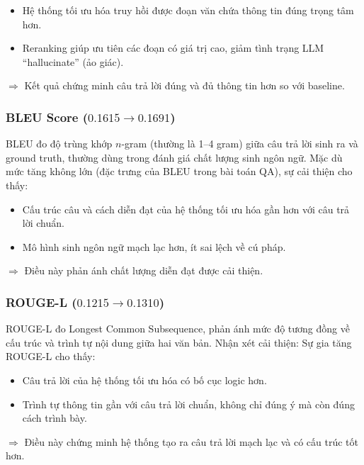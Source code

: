 \begin{itemize}
    \item Hệ thống tối ưu hóa truy hồi được đoạn văn chứa thông tin đúng trọng tâm hơn.
    \item Reranking giúp ưu tiên các đoạn có giá trị cao, giảm tình trạng LLM ``hallucinate'' (ảo
    giác).
\end{itemize}

$\Rightarrow$ Kết quả chứng minh câu trả lời đúng và đủ thông tin hơn so với baseline.

\subsubsection*{BLEU Score ($0.1615 \rightarrow 0.1691$)}

BLEU đo độ trùng khớp $n$-gram (thường là 1--4 gram) giữa câu trả lời sinh ra và ground truth,
thường dùng trong đánh giá chất lượng sinh ngôn ngữ. Mặc dù mức tăng không lớn (đặc trưng
của BLEU trong bài toán QA), sự cải thiện cho thấy:

\begin{itemize}
    \item Cấu trúc câu và cách diễn đạt của hệ thống tối ưu hóa gần hơn với câu trả lời chuẩn.
    \item Mô hình sinh ngôn ngữ mạch lạc hơn, ít sai lệch về cú pháp.
\end{itemize}

$\Rightarrow$ Điều này phản ánh chất lượng diễn đạt được cải thiện.

\subsubsection*{ROUGE-L ($0.1215 \rightarrow 0.1310$)}

ROUGE-L đo Longest Common Subsequence, phản ánh mức độ tương đồng về cấu trúc và trình
tự nội dung giữa hai văn bản. Nhận xét cải thiện: Sự gia tăng ROUGE-L cho thấy:

\begin{itemize}
    \item Câu trả lời của hệ thống tối ưu hóa có bố cục logic hơn.
    \item Trình tự thông tin gần với câu trả lời chuẩn, không chỉ đúng ý mà còn đúng cách trình
    bày.
\end{itemize}

$\Rightarrow$ Điều này chứng minh hệ thống tạo ra câu trả lời mạch lạc và có cấu trúc tốt hơn.

